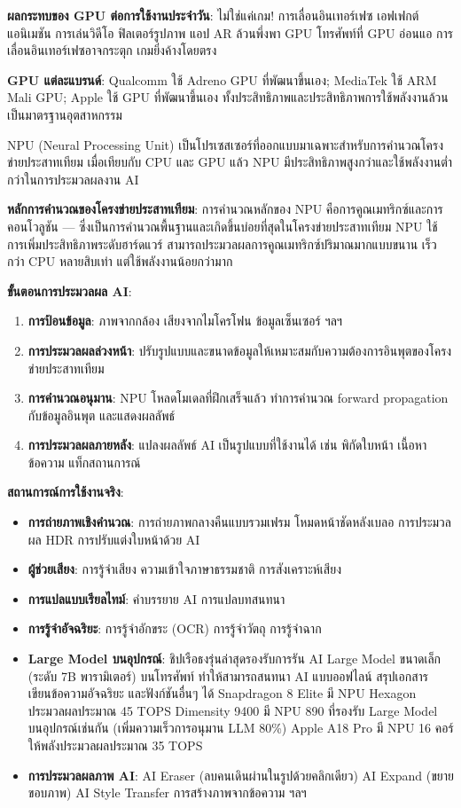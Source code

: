 \textbf{ผลกระทบของ GPU ต่อการใช้งานประจำวัน}: ไม่ใช่แค่เกม! การเลื่อนอินเทอร์เฟซ เอฟเฟกต์แอนิเมชัน การเล่นวิดีโอ ฟิลเตอร์รูปภาพ แอป AR ล้วนพึ่งพา GPU โทรศัพท์ที่ GPU อ่อนแอ การเลื่อนอินเทอร์เฟซอาจกระตุก เกมยิ่งค้างโดยตรง

\textbf{GPU แต่ละแบรนด์}: Qualcomm ใช้ Adreno GPU ที่พัฒนาขึ้นเอง; MediaTek ใช้ ARM Mali GPU; Apple ใช้ GPU ที่พัฒนาขึ้นเอง ทั้งประสิทธิภาพและประสิทธิภาพการใช้พลังงานล้วนเป็นมาตรฐานอุตสาหกรรม


NPU (Neural Processing Unit) เป็นโปรเซสเซอร์ที่ออกแบบมาเฉพาะสำหรับการคำนวณโครงข่ายประสาทเทียม เมื่อเทียบกับ CPU และ GPU แล้ว NPU มีประสิทธิภาพสูงกว่าและใช้พลังงานต่ำกว่าในการประมวลผลงาน AI

\textbf{หลักการคำนวณของโครงข่ายประสาทเทียม}: การคำนวณหลักของ NPU คือการคูณเมทริกซ์และการคอนโวลูชัน — ซึ่งเป็นการคำนวณพื้นฐานและเกิดขึ้นบ่อยที่สุดในโครงข่ายประสาทเทียม NPU ใช้การเพิ่มประสิทธิภาพระดับฮาร์ดแวร์ สามารถประมวลผลการคูณเมทริกซ์ปริมาณมากแบบขนาน เร็วกว่า CPU หลายสิบเท่า แต่ใช้พลังงานน้อยกว่ามาก

\textbf{ขั้นตอนการประมวลผล AI}:

\begin{enumerate}
  \item \textbf{การป้อนข้อมูล}: ภาพจากกล้อง เสียงจากไมโครโฟน ข้อมูลเซ็นเซอร์ ฯลฯ
  \item \textbf{การประมวลผลล่วงหน้า}: ปรับรูปแบบและขนาดข้อมูลให้เหมาะสมกับความต้องการอินพุตของโครงข่ายประสาทเทียม
  \item \textbf{การคำนวณอนุมาน}: NPU โหลดโมเดลที่ฝึกเสร็จแล้ว ทำการคำนวณ forward propagation กับข้อมูลอินพุต และแสดงผลลัพธ์
  \item \textbf{การประมวลผลภายหลัง}: แปลงผลลัพธ์ AI เป็นรูปแบบที่ใช้งานได้ เช่น พิกัดใบหน้า เนื้อหาข้อความ แท็กสถานการณ์
\end{enumerate}

\textbf{สถานการณ์การใช้งานจริง}:

\begin{itemize}
  \item \textbf{การถ่ายภาพเชิงคำนวณ}: การถ่ายภาพกลางคืนแบบรวมเฟรม โหมดหน้าชัดหลังเบลอ การประมวลผล HDR การปรับแต่งใบหน้าด้วย AI
  \item \textbf{ผู้ช่วยเสียง}: การรู้จำเสียง ความเข้าใจภาษาธรรมชาติ การสังเคราะห์เสียง
  \item \textbf{การแปลแบบเรียลไทม์}: คำบรรยาย AI การแปลบทสนทนา
  \item \textbf{การรู้จำอัจฉริยะ}: การรู้จำอักขระ (OCR) การรู้จำวัตถุ การรู้จำฉาก
  \item \textbf{Large Model บนอุปกรณ์}: ชิปเรือธงรุ่นล่าสุดรองรับการรัน AI Large Model ขนาดเล็ก (ระดับ 7B พารามิเตอร์) บนโทรศัพท์ ทำให้สามารถสนทนา AI แบบออฟไลน์ สรุปเอกสาร เขียนข้อความอัจฉริยะ และฟังก์ชันอื่นๆ ได้ Snapdragon 8 Elite มี NPU Hexagon ประมวลผลประมาณ 45 TOPS Dimensity 9400 มี NPU 890 ที่รองรับ Large Model บนอุปกรณ์เช่นกัน (เพิ่มความเร็วการอนุมาน LLM 80\%) Apple A18 Pro มี NPU 16 คอร์ ให้พลังประมวลผลประมาณ 35 TOPS
  \item \textbf{การประมวลผลภาพ AI}: AI Eraser (ลบคนเดินผ่านในรูปด้วยคลิกเดียว) AI Expand (ขยายขอบภาพ) AI Style Transfer การสร้างภาพจากข้อความ ฯลฯ
\end{itemize}

